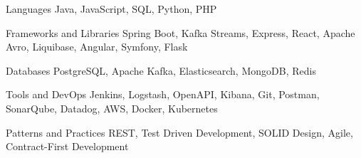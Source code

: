 
\begin{cvskills}

  \cvskill
    {Languages} %
    {Java, JavaScript, SQL, Python, PHP} %

  \cvskill
    {Frameworks  and Libraries} %
    {Spring Boot, Kafka Streams, Express, React, Apache Avro, Liquibase, Angular, Symfony, Flask} %

  \cvskill
    {Databases} %
    {PostgreSQL, Apache Kafka, Elasticsearch, MongoDB, Redis} %

  \cvskill
    {Tools and DevOps} %
    {Jenkins, Logstash, OpenAPI, Kibana, Git, Postman, SonarQube, Datadog, AWS, Docker, Kubernetes} %

  \cvskill
    {Patterns and Practices} %
    {REST, Test Driven Development, SOLID Design, Agile, Contract-First Development} %

\end{cvskills}
